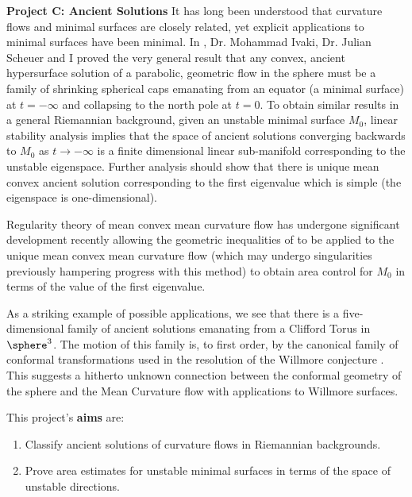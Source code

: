 \documentclass[12pt]{amsart}
\begin{document}
\noindent\textbf{Project C: Ancient Solutions}
\label{sec-2-3}
It has long been understood that curvature flows and minimal surfaces are closely related, yet explicit applications to minimal surfaces have been minimal. In \cite{2016arXiv160401694B}, Dr. Mohammad Ivaki, Dr. Julian Scheuer and I proved the very general result that any convex, ancient hypersurface solution of a parabolic, geometric flow in the sphere must be a family of shrinking spherical caps emanating from an equator (a minimal surface) at $t=-\infty$ and collapsing to the north pole at $t=0$. To obtain similar results in a general Riemannian background, given an unstable minimal surface $M_0$, linear stability analysis implies that the space of ancient solutions converging backwards to $M_0$ as $t\to-\infty$ is a finite dimensional linear sub-manifold corresponding to the unstable eigenspace. Further analysis should show that there is unique mean convex ancient solution corresponding to the first eigenvalue which is simple (the eigenspace is one-dimensional).

Regularity theory of mean convex mean curvature flow has undergone significant development recently \cite{2013arXiv1304.0926H,MR3570481} allowing the geometric inequalities of \cite{MR1650335} to be applied to the unique mean convex mean curvature flow (which may undergo singularities previously hampering progress with this method) to obtain area control for $M_0$ in terms of the value of the first eigenvalue.

As a striking example of possible applications, we see that there is a five-dimensional family of ancient solutions emanating from a Clifford Torus in $\sphere^3$. The motion of this family is, to first order, by the canonical family of conformal transformations used in the resolution of the Willmore conjecture \cite{MR3152944}. This suggests a hitherto unknown connection between the conformal geometry of the sphere and the Mean Curvature flow with applications to Willmore surfaces.

This project's \textbf{aims} are:
\begin{enumerate}[label=\textbf{(C.\arabic*)}]
\item Classify ancient solutions of curvature flows in Riemannian backgrounds.
\item Prove area estimates for unstable minimal surfaces in terms of the space of unstable directions.
\end{enumerate}

\smallskip{}
\label{sec-3}
\end{document}
